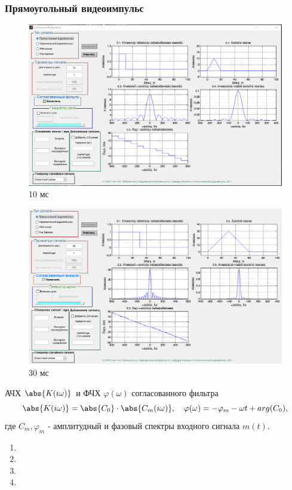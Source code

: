 \subsubsection{Прямоугольный видеоимпульс}
\begin{figure}[H]
    \centering
    \includegraphics[width=0.9\linewidth]{imgs/task_2/t2s1_10.png}
    \caption{10 мс}
    \label{fig:task_2_1_10}
\end{figure}
\begin{figure}[H]
    \centering
    \includegraphics[width=0.9\linewidth]{imgs/task_2/t2s1_30.png}
    \caption{30 мс}
    \label{fig:task_2_1_30}
\end{figure}
АЧХ $\abs{K(i \omega)}$ и ФЧХ $\varphi (\omega)$ согласованного фильтра
\begin{equation}
    \abs{K(i \omega)} = \abs{C_0} \cdot \abs{C_m(i \omega)}, \quad
    \varphi (\omega) = -\varphi_m  -\omega t + arg(C_0),
\end{equation}
где $C_m, \varphi_m $ - амплитудный и фазовый спектры входного сигнала $m(t)$.
\begin{enumerate}
    \item 
    \item 
    \item 
    \item 
\end{enumerate}


